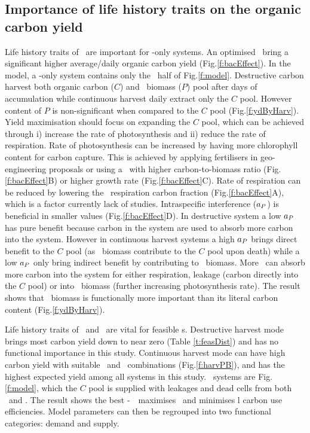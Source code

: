 \documentclass[../thesis.tex]{subfiles} %
\begin{document}
\subsection{Importance of life history traits on the organic carbon yield}
Life history traits of \phy\ are important for \phy-only systems. An optimised \phy\ bring a significant higher average/daily organic carbon yield (Fig.\ref{f:bacEffect}).  In the model, a \phy-only system contains only the \phy\ half of Fig.\ref{f:model}.  Destructive carbon harvest both organic carbon ($C$) and \phy\ biomass ($P$) pool after days of accumulation while continuous harvest daily extract only the $C$ pool.  However content of $P$ is non-significant when compared to the $C$ pool (Fig.\ref{f:ydByHarv}).  Yield maximisation should focus on expanding the $C$ pool, which can be achieved through \Rn{1}) increase the rate of photosynthesis and \Rn{2}) reduce the rate of respiration.  Rate of photosynthesis can be increased by having more chlorophyll content for carbon capture.  This is achieved by applying fertilisers in geo-engineering proposals \autocite{gnanadesikan2008export,lawrence2014efficiency,trick2010iron,kwiatkowski2015atmospheric,lovelock2007ocean} or using a \phy\ with higher carbon-to-biomass ratio (Fig.\ref{f:bacEffect}B) or higher growth rate (Fig.\ref{f:bacEffect}C).  Rate of respiration can be reduced by lowering the \phy\ respiration carbon fraction (Fig.\ref{f:bacEffect}A), which is a factor currently lack of studies.  Intraspecific interference ($a_P$) is beneficial in smaller values (Fig.\ref{f:bacEffect}D).  In destructive system a low $a_P$ has pure benefit because carbon in the system are used to absorb more carbon into the system.  However in continuous harvest systems a high $a_P$ brings direct benefit to the $C$ pool (as \phy\ biomass contribute to the $C$ pool upon death) while a low $a_P$ only bring indirect benefit by contributing to \phy\ biomass.  More \phy\ can absorb more carbon into the system for either respiration, leakage (carbon directly into the $C$ pool) or into \phy\ biomass (further increasing photosynthesis rate).  The result shows that \phy\ biomass is functionally more important than its literal carbon content (Fig.\ref{f:ydByHarv}).

Life history traits of \phy\ and \bac\ are vital for feasible \pbs s.  Destructive harvest mode brings most carbon yield down to near zero (Table \ref{t:feasDist}) and has no functional importance in this study.  Continuous harvest mode can have high carbon yield with suitable \phy\ and \bac\ combinations (Fig.\ref{f:harvPB}), and has the highest expected yield among all systems in this study.  \PBH\ systems are Fig.\ref{f:model}, which the $C$ pool is supplied with leakages and dead cells from both \phy\ and \bac.  The result shows the best \phy-\bac\ \pbs\ maximises \phy\ and minimises \bac l carbon use efficiencies.  Model parameters can then be regrouped into two functional categories: demand and supply.
\end{document}
